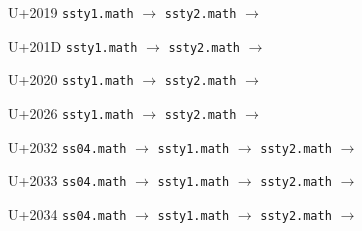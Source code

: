 \documentclass{article}
\begin{document}
\begin{substitutions}

U+2019  \linebreak
    \texttt{ssty1.math} $\to$  \linebreak
    \texttt{ssty2.math} $\to$  

\goodbreak

U+201D  \linebreak
    \texttt{ssty1.math} $\to$  \linebreak
    \texttt{ssty2.math} $\to$  

\goodbreak

U+2020  \linebreak
    \texttt{ssty1.math} $\to$  \linebreak
    \texttt{ssty2.math} $\to$  

\goodbreak

U+2026  \linebreak
    \texttt{ssty1.math} $\to$  \linebreak
    \texttt{ssty2.math} $\to$  

\goodbreak

U+2032  \linebreak
    \texttt{ss04.math} $\to$  \linebreak
    \texttt{ssty1.math} $\to$  \linebreak
    \texttt{ssty2.math} $\to$  

\goodbreak

U+2033  \linebreak
    \texttt{ss04.math} $\to$  \linebreak
    \texttt{ssty1.math} $\to$  \linebreak
    \texttt{ssty2.math} $\to$  

\goodbreak

U+2034  \linebreak
    \texttt{ss04.math} $\to$  \linebreak
    \texttt{ssty1.math} $\to$  \linebreak
    \texttt{ssty2.math} $\to$  


\end{substitutions}
\end{document}
